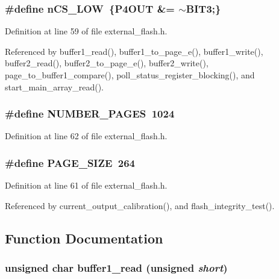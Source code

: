 \subsubsection{\setlength{\rightskip}{0pt plus 5cm}\#define n\-CS\_\-LOW~\{P4OUT \&= $\sim$BIT3;\}}\label{external__flash_8h_a0}




Definition at line 59 of file external\_\-flash.h.

Referenced by buffer1\_\-read(), buffer1\_\-to\_\-page\_\-e(), buffer1\_\-write(), buffer2\_\-read(), buffer2\_\-to\_\-page\_\-e(), buffer2\_\-write(), page\_\-to\_\-buffer1\_\-compare(), poll\_\-status\_\-register\_\-blocking(), and start\_\-main\_\-array\_\-read().
\subsubsection{\setlength{\rightskip}{0pt plus 5cm}\#define NUMBER\_\-PAGES~1024}\label{external__flash_8h_a3}




Definition at line 62 of file external\_\-flash.h.
\subsubsection{\setlength{\rightskip}{0pt plus 5cm}\#define PAGE\_\-SIZE~264}\label{external__flash_8h_a2}




Definition at line 61 of file external\_\-flash.h.

Referenced by current\_\-output\_\-calibration(), and flash\_\-integrity\_\-test().

\subsection{Function Documentation}
\subsubsection{\setlength{\rightskip}{0pt plus 5cm}unsigned char buffer1\_\-read (unsigned {\em short})}\label{external__flash_8h_a15}




